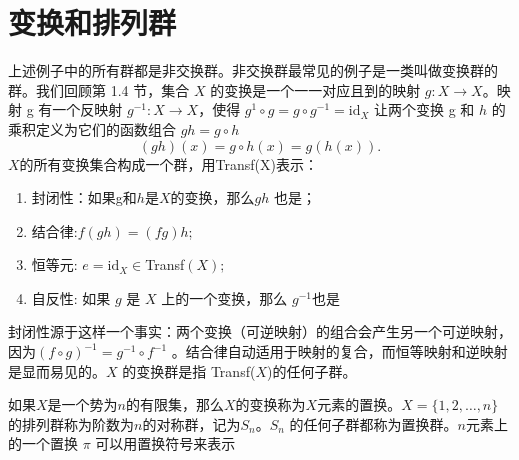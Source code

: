 \documentclass[hyperref,UTF8]{ctexbook}
\begin{document}
\section{变换和排列群}
上述例子中的所有群都是非交换群。非交换群最常见的例子是一类叫做变换群的群。我们回顾第 1.4 节，集合 $X$ 的变换是一个一一对应且到的映射 $g:X\to X$。映射 g 有一个反映射 $g^{-1}:X\to X$，使得 $g^{1}\circ g=g\circ g^{-1}=\mathrm{id}_X$ 让两个变换 g 和 $h$ 的乘积定义为它们的函数组合 $gh=g\circ h$
$$
(gh)(x)=g\circ h(x)=g(h(x)).
$$
$X$的所有变换集合构成一个群，用Transf(X)表示：
\begin{enumerate}
 \item[] 封闭性：如果g和$h$是$X$的变换，那么$gh$ 也是；
 \item[] 结合律{:}\:$f(gh)=(fg)h${;}
 \item[] 恒等元{: }$e= \mathrm{id}_X\in $Transf$( X) ; $
 \item[] 自反性: 如果 $g$ 是 $X$ 上的一个变换，那么 $g^{-1} $也是
\end{enumerate}
封闭性源于这样一个事实：两个变换（可逆映射）的组合会产生另一个可逆映射，因为$(f\circ g)^{-1}=g^{-1}\circ f^{-1}$ 。结合律自动适用于映射的复合，而恒等映射和逆映射是显而易见的。$X$ 的变换群是指 Transf($X$)的任何子群。

如果$X$是一个势为$n$的有限集，那么$X$的变换称为$X$元素的置换。$X=\{1,2,\dots,n\}$的排列群称为阶数为$n$的对称群，记为$S_n$。$S_n$ 的任何子群都称为置换群。$n$元素上的一个置换 $\pi$ 可以用置换符号来表示
\end{document}
